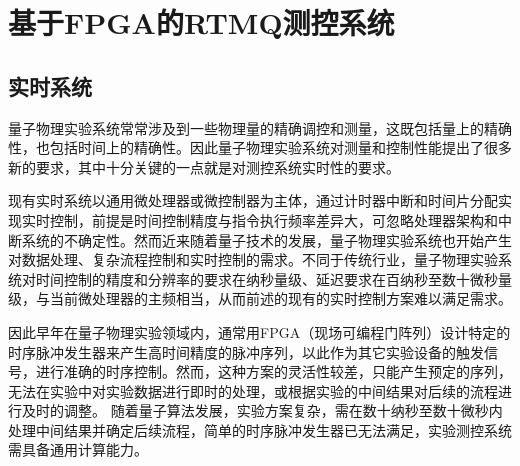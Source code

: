 
\chapter[基于FPGA的RTMQ测控系统]{基于FPGA的RTMQ测控系统\label{section:fpga_rtmq}}

\section[实时系统]{实时系统}

量子物理实验系统常常涉及到一些物理量的精确调控和测量，这既包括量上的精确性，也包括时间上的精确性。因此量子物理实验系统对测量和控制性能提出了很多新的要求，其中十分关键的一点就是对测控系统实时性的要求。


现有实时系统以通用微处理器或微控制器为主体，通过计时器中断和时间片分配实现实时控制，前提是时间控制精度与指令执行频率差异大，可忽略处理器架构和中断系统的不确定性。然而近来随着量子技术的发展，量子物理实验系统也开始产生对数据处理、复杂流程控制和实时控制的需求。不同于传统行业，量子物理实验系统对时间控制的精度和分辨率的要求在纳秒量级、延迟要求在百纳秒至数十微秒量级，与当前微处理器的主频相当，从而前述的现有的实时控制方案难以满足需求\cite[]{junhua03}。

因此早年在量子物理实验领域内，通常用FPGA（现场可编程门阵列）设计特定的时序脉冲发生器来产生高时间精度的脉冲序列，以此作为其它实验设备的触发信号，进行准确的时序控制。然而，这种方案的灵活性较差，只能产生预定的序列，无法在实验中对实验数据进行即时的处理，或根据实验的中间结果对后续的流程进行及时的调整\cite[]{junhua01}。
随着量子算法发展，实验方案复杂，需在数十纳秒至数十微秒内处理中间结果并确定后续流程，简单的时序脉冲发生器已无法满足，实验测控系统需具备通用计算能力。

